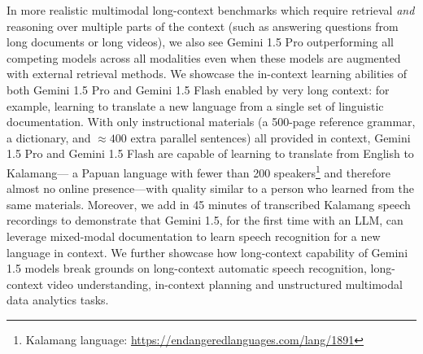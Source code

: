 In more realistic multimodal long-context benchmarks which require retrieval \textit{and} reasoning over multiple parts of the context (such as answering questions from long documents or long videos), we also see Gemini 1.5 Pro outperforming all competing models across all modalities even when these models are augmented with external retrieval methods. We showcase the in-context learning abilities of both Gemini 1.5 Pro and Gemini 1.5 Flash enabled by very long context: for example, learning to translate a new language from a single set of linguistic documentation. With only instructional materials (a 500-page reference grammar, a dictionary, and $\approx400$ extra parallel sentences) all provided in context, Gemini 1.5 Pro and Gemini 1.5 Flash are capable of learning to translate from English to Kalamang--- a Papuan language with fewer than 200 speakers\footnote{Kalamang language: \url{https://endangeredlanguages.com/lang/1891}} and therefore almost no online presence---with quality similar to a person who learned from the same materials. Moreover, we add in 45 minutes of transcribed Kalamang speech recordings to demonstrate that Gemini 1.5, for the first time with an LLM, can leverage mixed-modal documentation to learn speech recognition for a new language in context. We further showcase how long-context capability of Gemini 1.5 models break grounds on long-context automatic speech recognition, long-context video understanding, in-context planning and unstructured multimodal data analytics tasks.

